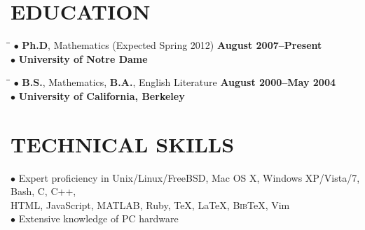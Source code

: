 \documentclass{resume}
\begin{document}
\begin{resume}


	\section{EDUCATION}  \vspace{0.05in}
	\begin{tabbing}
\hspace{2.3in}\= \hspace{2.6in}\= \kill
$\bullet$ \textbf{Ph.D}, Mathematics (Expected Spring 2012) \>\>\textbf{August 2007--Present}
\\ 
	$\bullet$ \textbf{University of Notre Dame} \\
      \end{tabbing}	
	\vspace{-0.5in} 
	\begin{tabbing}
\hspace{2.3in}\= \hspace{2.6in}\= \kill
$\bullet$ \textbf{B.S.}, Mathematics, \textbf{B.A.}, English Literature \>\>\textbf{August 2000--May 2004}\\	$\bullet$ \textbf{University of California, Berkeley}
      \end{tabbing}

\section{TECHNICAL SKILLS} \vspace{0.05in}
	$\bullet$ Expert proficiency in 
	Unix/Linux/FreeBSD, Mac OS X, Windows XP/Vista/7, Bash, C, C++, \\
	\phantom{$\bullet$} HTML, 
JavaScript, MATLAB, Ruby, \TeX{}, \LaTeX{}, B\textsc{ib}\TeX{}, Vim\\
	$\bullet$ Extensive knowledge of PC hardware 

\end{resume}
\end{document}

